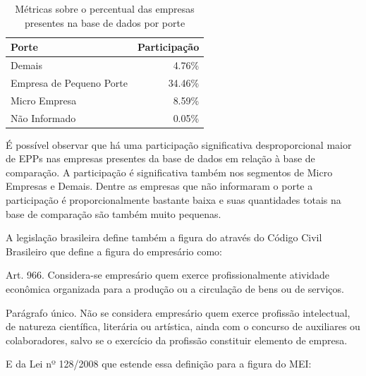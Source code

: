 \begin{table}[htb]
\centering
\caption{Métricas sobre o percentual das empresas presentes na base de dados por porte}
\label{tab:participacao-por-porte}
\begin{tabular}{lr}
\toprule
Porte & Participação \\
\midrule
Demais                   &    4.76\% \\
Empresa de Pequeno Porte &    34.46\% \\
Micro Empresa            &    8.59\% \\
Não Informado            &    0.05\% \\
\bottomrule
\end{tabular}
\fdadospesquisa
\end{table}

É possível observar que há uma participação significativa desproporcional maior de EPPs nas empresas presentes da base de dados em relação à base de comparação. A participação é significativa também nos segmentos de Micro Empresas e Demais. Dentre as empresas que não informaram o porte a participação é proporcionalmente bastante baixa e suas quantidades totais na base de comparação são também muito pequenas.

A legislação brasileira define também a figura do  através do Código Civil Brasileiro \cite{lei:10406:lei-codigo-civil} que define a figura do empresário como:

\begin{citacao}
Art. 966. Considera-se empresário quem exerce profissionalmente atividade econômica organizada para a produção ou a circulação de bens ou de serviços.

Parágrafo único. Não se considera empresário quem exerce profissão intelectual, de natureza científica, literária ou artística, ainda com o concurso de auxiliares ou colaboradores, salvo se o exercício da profissão constituir elemento de empresa.
\end{citacao}

E da Lei nº 128/2008 \cite{lei:128:lei-mei} que estende essa definição para a figura do MEI:


